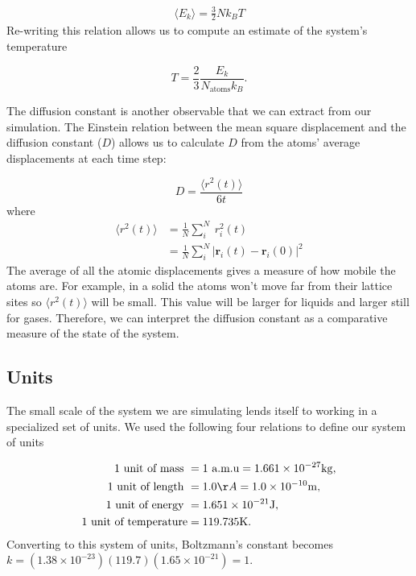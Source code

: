 \documentclass[10pt,showpacs,preprintnumbers,footinbib,amsmath,amssymb,aps,prl,twocolumn,groupedaddress,superscriptaddress,showkeys]{revtex4-1}
\newcommand{\pwrten}[1]{%
	\ensuremath{10^{#1}} }
\begin{document}
\begin{align*}
	\langle E_k \rangle = \frac{3}{2} N k_B T
\end{align*}
Re-writing this relation allows us to compute an estimate of the
system's temperature

\begin{equation}
	T = \frac{2}{3}\frac{E_k}{N_\text{atoms} k_B}.
	\label{eq:temperature}
\end{equation}

The diffusion constant is another observable that we can extract
from our simulation. The Einstein relation between the mean square
displacement and the diffusion constant ($D$) allows us to calculate
$D$ from the atoms' average displacements at each time step:

\begin{equation}
	D = \frac{\langle r^2(t) \rangle }{6t}
	\label{eq:diffusion}
\end{equation}
where 
\begin{align*}
	\langle r^2(t) \rangle &= \frac{1}{N} \sum_i^{N} \ r_i^2(t)\\
	&= \frac{1}{N} \sum_i^{N} |\mathbf{r}_i(t) - \mathbf{r}_i(0)|^2
\end{align*}
The average of all the atomic displacements gives a measure
of how mobile the atoms are. For example, in a solid the atoms won't
move far from their lattice sites so $\langle r^2(t) \rangle$ will be
small. This value will be larger for liquids and larger still for gases.
Therefore, we can interpret the diffusion constant as a comparative
measure of the state of the system.


\subsection*{Units}

The small scale of the system we are simulating lends itself to working in a
specialized set of units. We used the following four relations to define our
system of units

\begin{align*}
	\text{1 unit of mass } &= 1 \text{ a.m.u} = 1.661\times 10^{-27}\mathrm{kg},\\
	\text{1 unit of length } &= 1.0 {\AA} = 1.0\times 10^{-10}\mathrm{m},\\
	\text{1 unit of energy } &= 1.651\times 10^{-21}\mathrm{J},\\
	\text{1 unit of temperature} &= 119.735\mathrm{K}.
\end{align*}
Converting to this system of units, Boltzmann's constant becomes
$k = (1.38 \times \pwrten{-23} )(119.7)(1.65 \times \pwrten{-21}) = 1$.
\end{document}
